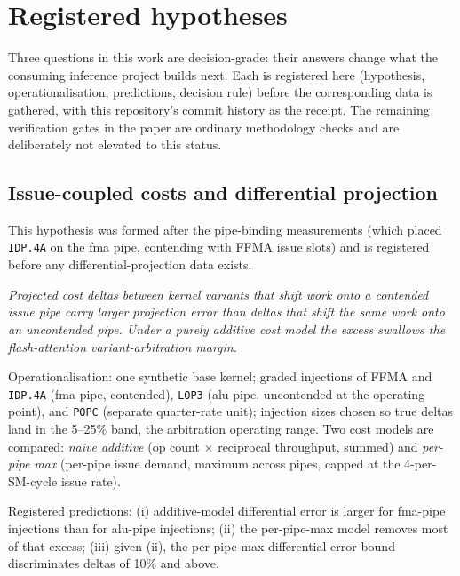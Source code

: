 \section{Registered hypotheses}
\label{sec:hypotheses}

Three questions in this work are decision-grade: their answers change what
the consuming inference project builds next. Each is registered here
(hypothesis, operationalisation, predictions, decision rule) before the
corresponding data is gathered, with this repository's commit history as
the receipt. The remaining verification gates in the paper are ordinary
methodology checks and are deliberately not elevated to this status.

\subsection{Issue-coupled costs and differential projection}
\label{sec:hyp-coupling}

This hypothesis was formed after the pipe-binding measurements (which
placed \texttt{IDP.4A} on the fma pipe, contending with FFMA issue slots)
and is registered before any differential-projection data exists.

\emph{Projected cost deltas between kernel variants that shift work onto a
contended issue pipe carry larger projection error than deltas that shift
the same work onto an uncontended pipe. Under a purely additive cost model
the excess swallows the flash-attention variant-arbitration margin.}

Operationalisation: one synthetic base kernel; graded injections of FFMA
and \texttt{IDP.4A} (fma pipe, contended), \texttt{LOP3} (alu pipe,
uncontended at the operating point), and \texttt{POPC} (separate
quarter-rate unit); injection sizes chosen so true deltas land in the
5--25\% band, the arbitration operating range. Two cost models are
compared: \emph{naive additive} (op count \(\times\) reciprocal
throughput, summed) and \emph{per-pipe max} (per-pipe issue demand,
maximum across pipes, capped at the 4-per-SM-cycle issue rate).

Registered predictions: (i) additive-model differential error is larger
for fma-pipe injections than for alu-pipe injections; (ii) the per-pipe-max
model removes most of that excess; (iii) given (ii), the per-pipe-max
differential error bound discriminates deltas of 10\% and above.

